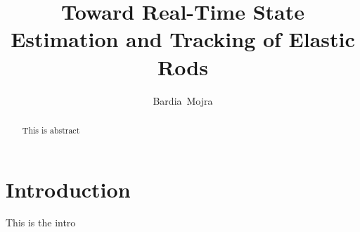 \documentclass[journal]{IEEEtran}
\begin{document}
%
\title{Toward Real-Time State Estimation and Tracking of Elastic Rods}
\author{Bardia~Mojra}
\maketitle

\begin{abstract}
This is abstract
\end{abstract}



\section{Introduction}
This is the intro\\
\end{document}
